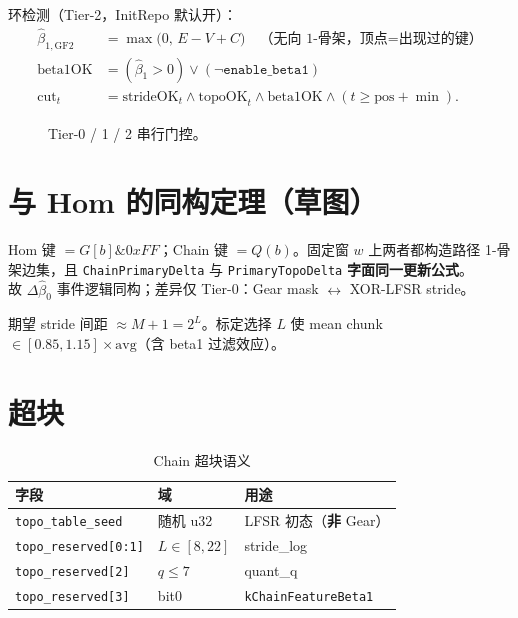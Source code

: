 环检测（Tier-2，InitRepo 默认开）：
\begin{align}
\hat\beta_{1,\mathrm{GF2}}
&= \max\bigl(0,\, E - V + C\bigr)
\quad\text{（无向 1-骨架，顶点=出现过的键）}\\
\mathrm{beta1OK} &= (\hat\beta_1>0)\lor(\neg\texttt{enable\_beta1})\\
\mathrm{cut}_t &= \mathrm{strideOK}_t\land\mathrm{topoOK}_t\land\mathrm{beta1OK}\land(t\ge\mathrm{pos}+\min).
\end{align}

\begin{figure}[htbp]
\centering
{}
\caption{Tier-0 / 1 / 2 串行门控。}
\label{fig:chain-tiers}
\end{figure}

\section{与 Hom 的同构定理（草图）}

\begin{designbox}[同构草图]
Hom 键 $=G[b]\mathbin{\&}0xFF$；Chain 键 $=Q(b)$。固定窗 $w$ 上两者都构造路径 1-骨架边集，且
\texttt{ChainPrimaryDelta} 与 \texttt{PrimaryTopoDelta} \textbf{字面同一更新公式}。\\
故 $\Delta\hat\beta_0$ 事件逻辑同构；差异仅 Tier-0：Gear mask $\leftrightarrow$ XOR-LFSR stride。
\end{designbox}

期望 stride 间距 $\approx M+1=2^L$。标定选择 $L$ 使 mean chunk $\in[0.85,1.15]\times\mathrm{avg}$（含 beta1 过滤效应）。

\section{超块}

\begin{table}[htbp]
\centering
\caption{Chain 超块语义}
\label{tab:chain-sb}
\begin{tabular}{@{}llp{6.8cm}@{}}
\toprule
字段 & 域 & 用途 \\
\midrule
\texttt{topo\_table\_seed} & 随机 u32 & LFSR 初态（\textbf{非} Gear） \\
\texttt{topo\_reserved[0:1]} & $L\in[8,22]$ & stride\_log \\
\texttt{topo\_reserved[2]} & $q\le7$ & quant\_q \\
\texttt{topo\_reserved[3]} & bit0 & \texttt{kChainFeatureBeta1} \\
\bottomrule
\end{tabular}
\end{table}

